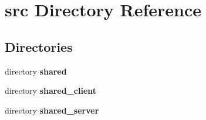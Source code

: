 \section{src Directory Reference}
\label{dir_68267d1309a1af8e8297ef4c3efbcdba}
\subsection*{Directories}
\begin{DoxyCompactItemize}
\item 
directory {\bf shared}
\item 
directory {\bf shared\+\_\+client}
\item 
directory {\bf shared\+\_\+server}
\end{DoxyCompactItemize}
